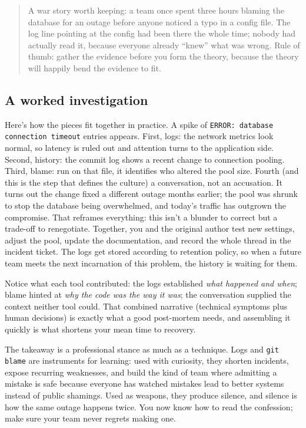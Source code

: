 \begin{quote}\small
A war story worth keeping: a team once spent three hours blaming the database for an outage before anyone noticed a typo in a config file. The log line pointing at the config had been there the whole time; nobody had actually read it, because everyone already ``knew'' what was wrong. Rule of thumb: gather the evidence before you form the theory, because the theory will happily bend the evidence to fit.
\end{quote}



\subsection{A worked investigation}


Here's how the pieces fit together in practice. A spike of \texttt{ERROR: database connection timeout} entries appears. First, logs: the network metrics look normal, so latency is ruled out and attention turns to the application side. Second, history: the commit log shows a recent change to connection pooling. Third, blame: run on that file, it identifies who altered the pool size. Fourth (and this is the step that defines the culture) a conversation, not an accusation. It turns out the change fixed a different outage months earlier; the pool was shrunk to stop the database being overwhelmed, and today's traffic has outgrown the compromise. That reframes everything: this isn't a blunder to correct but a trade-off to renegotiate. Together, you and the original author test new settings, adjust the pool, update the documentation, and record the whole thread in the incident ticket. The logs get stored according to retention policy, so when a future team meets the next incarnation of this problem, the history is waiting for them.


Notice what each tool contributed: the logs established \emph{what happened and when}; blame hinted at \emph{why the code was the way it was}; the conversation supplied the context neither tool could. That combined narrative (technical symptoms plus human decisions) is exactly what a good post-mortem needs, and assembling it quickly is what shortens your mean time to recovery.


The takeaway is a professional stance as much as a technique. Logs and \texttt{git blame} are instruments for learning: used with curiosity, they shorten incidents, expose recurring weaknesses, and build the kind of team where admitting a mistake is safe because everyone has watched mistakes lead to better systems instead of public shamings. Used as weapons, they produce silence, and silence is how the same outage happens twice. You now know how to read the confession; make sure your team never regrets making one.

